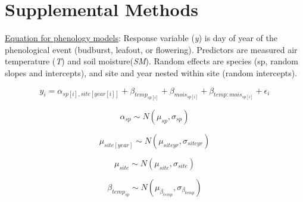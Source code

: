 \documentclass{article}
\begin{document}
\begin{singlespace}

\end{singlespace}


\clearpage

\section* {Supplemental Methods}
\underline{Equation for phenology models}: 
Response variable (\textit{y}) is day of year of the phenological event (budburst, leafout, or flowering). Predictors are measured air temperature (\textit{T}) and soil moisture(\textit{SM}). Random effects are species (sp, random slopes and intercepts), and  site and year nested within site (random intercepts).

\begin{equation}
y_{i}=\alpha_{sp[i],site[year[i]]} + \beta_{temp_{sp[i]}}+ \beta_{mois_{sp[i]}} + \beta_{temp:mois_{sp[i]}}+\epsilon_{i}\label{eq:8}
\end{equation}

\begin{equation}
\alpha_{sp}\sim N(\mu_{sp}, \sigma_{sp})
\end{equation}

\begin{equation}
\mu_{site[year]} \sim N(\mu_{siteyr}, \sigma_{siteyr})
\end{equation}

\begin{equation}
\mu_{site} \sim N(\mu_{site}, \sigma_{site})
\end{equation}

\begin{equation}
\beta_{temp_{sp}} \sim N(\mu_{\beta_{temp}}, \sigma_{\beta_{temp}})
\end{equation}
\end{document}
